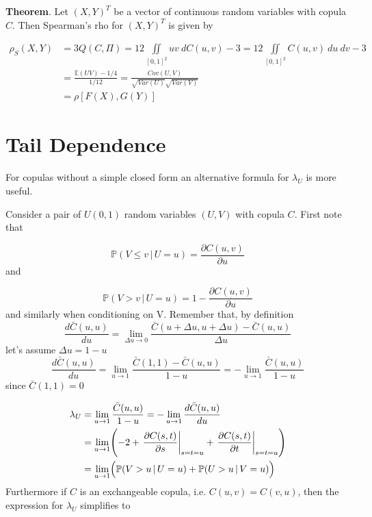 \documentclass{article}
\begin{document}

\noindent\textbf{Theorem}.  Let $(X, Y)^T$ be a vector of continuous random variables with copula $C$. Then Spearman's rho for $(X, Y)^T$ is given by

\begin{align}
\rho_S (X, Y) & = 3Q(C, \Pi) = 12 \iint\limits_{[0, 1]^2} uv \> dC(u, v) - 3 = 12 \iint\limits_{[0, 1]^2} C(u,v) \>du\>dv - 3 \\
& = \frac{\mathbb{E}(UV) - 1/4}{1/12} = \frac{Cov(U, V)}{\sqrt{Var(U)}\sqrt{Var(V)}} \\
& = \rho[F(X), G(Y)]
\end{align}
%
%
\section{Tail Dependence}

For copulas without a simple closed form an alternative formula for $\lambda_U$ is more useful.

Consider a pair of $U(0,1)$ random variables $(U,V)$ with copula $C$. First note that 

\begin{equation}
\mathbb{P} (V \le v \, | \, U = u) = \frac{\partial C(u,v)}{\partial u}
\end{equation}
and

\begin{equation}
\mathbb{P} (V > v \, | \, U = u) = 1- \frac{\partial C(u,v)}{\partial u}
\end{equation}
and similarly when conditioning on V. Remember that, by definition
$$
\frac{d\bar C(u,u)}{du} = \lim\limits_{\Delta u\rightarrow 0} \frac{\bar C(u+\Delta u,u+\Delta u) - \bar C(u,u) }{\Delta u}
$$
let's assume $\Delta u = 1-u$
$$
\frac{d\bar C(u,u)}{du} = \lim\limits_{u\rightarrow 1} \frac{\bar C(1, 1) - \bar C(u,u) }{1- u} = -\lim\limits_{u\rightarrow 1} \frac{\bar C(u,u) }{1- u} 
$$
since $\bar C(1,1)=0$

\begin{equation}
\begin{split}
\lambda_U & = \lim\limits_{u\rightarrow 1} \frac{\bar C(u,u) }{1- u} = - \lim\limits_{u\rightarrow 1}  \frac{d\bar C(u,u)}{du}  \\
                 & = \lim\limits_{u\rightarrow 1} 
                       \Biggl(
							-2 + \left.\frac{\partial C(s,t)}{\partial s} \right|_{s=t=u}+ \left.\frac{\partial C(s,t)}{\partial t} \right|_{s=t=u}                       
                       \Biggr) \\
                 & = \lim\limits_{u\rightarrow 1} \Bigl(
                           \mathbb{P} (V > u\, |\, U = u) + \mathbb{P} (U > u \,|\, V = u)      
                       \Bigr)
\end{split}
\end{equation}
Furthermore if $C$ is an exchangeable copula, i.e. $C(u,v) = C(v,u)$, then the expression for $\lambda_U$ simplifies to
\end{document}
